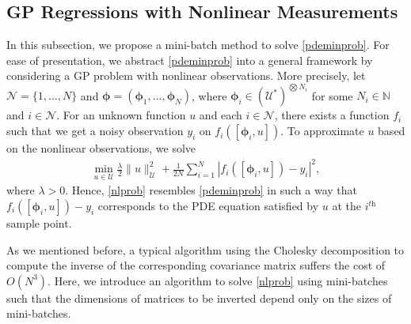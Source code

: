 \documentclass[10pt,reqno]{amsart}
\newcommand{\1}{{\chi}}
\numberwithin{equation}{section}
\theoremstyle{thmlemcorr}
\numberwithin{theorem}{section}
\theoremstyle{thmlemcorr*}
\theoremstyle{defi}
\theoremstyle{remexample}
\theoremstyle{ass}
\begin{document}
\subsection{GP Regressions with Nonlinear Measurements}
\label{subsecGPnl}
In this subsection, we propose a mini-batch method to solve \eqref{pdeminprob}. For ease of presentation, we abstract \eqref{pdeminprob} into a general framework by considering a GP problem with nonlinear observations. More precisely, let $\mathcal{N}=\{1, \dots, N\}$ and  $\boldsymbol{\phi}=(\boldsymbol{\phi}_1, \dots, \boldsymbol{\phi}_N)$, where $\boldsymbol{\phi}_i\in (\mathcal{U}^*)^{\bigotimes N_i}$ for some $N_i\in \mathbb{N}$ and $i\in \mathcal{N}$. For an unknown function $u$ and  each $i\in \mathcal{N}$, there exists a function $f_i$ such that we get a noisy observation $y_i$ on $f_i([\boldsymbol{\phi}_i, u])$. To approximate $u$ based on the nonlinear observations, we  solve 
\begin{align}
	\label{nlprob}
	\min_{u\in \mathcal{U}}\frac{\lambda}{2}\|u\|_{\mathcal{U}}^2 + \frac{1}{2N}\sum_{i=1}^N|f_i([\boldsymbol{\phi}_i, u])-{y}_i|^2,
\end{align}
where  $\lambda>0$. 
Hence, \eqref{nlprob} resembles \eqref{pdeminprob} in such a way that 
$f_i([\boldsymbol{\phi}_i, u])-y_i$  corresponds to the PDE equation satisfied by $u$ at the $i^{\textit{th}}$ sample point. 

As we mentioned before, a typical algorithm using the Cholesky decomposition to compute the inverse of the corresponding covariance matrix suffers the cost of $O(N^3)$. Here, we introduce an algorithm to solve \eqref{nlprob} using mini-batches such that the dimensions of matrices to be inverted depend only on the sizes of mini-batches. 
\end{document}
